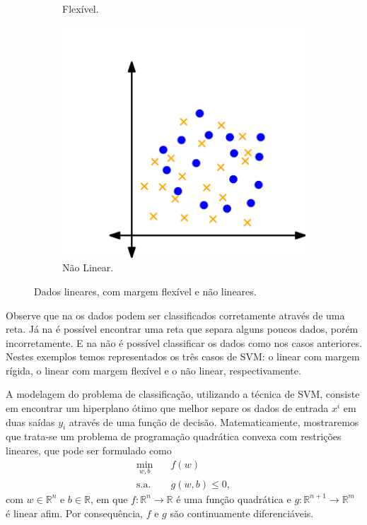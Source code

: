 \documentclass[12pt,a4paper]{scrartcl}
\def\RR{\mathds{R}}
\theoremstyle{definition}%
\begin{document}
\begin{figure}[!ht]
\begin{subfigure}[!ht]{0.3\textwidth}
	\caption{Flexível. \label{fig:classificacao_dados:hiperplano_SVM_flexivel}}
\end{subfigure}
\begin{subfigure}[!ht]{0.3\textwidth}
	\centering
	\includegraphics[width=\textwidth]{hiperplano_SVM_nao_linear}
	\caption{Não Linear. \label{fig:classificacao_dados:hiperplano_SVM_nao_linear}}
\end{subfigure}
\caption{Dados lineares, com margem flexível e não lineares. \label{fig:classificacao_dados}}
\end{figure}

Observe que na  os dados podem ser classificados corretamente através de uma reta. Já na  é possível encontrar uma reta que separa alguns poucos dados, porém incorretamente. E na  não é possível classificar os dados como nos casos anteriores. Nestes exemplos temos representados os três casos de SVM: o linear com margem rígida, o linear com margem flexível e o não linear, respectivamente.

A modelagem do problema de classificação, utilizando a técnica de SVM, consiste em encontrar um hiperplano ótimo que melhor separe os dados de entrada $x^i$ em duas saídas $y_i$ através de uma função de decisão. Matematicamente, mostraremos que trata-se um problema de programação quadrática convexa com restrições lineares, que pode ser formulado como
\[
\begin{aligned}
\min_{w,b} & \quad f(w) \\
\text{s.a.} &  \quad g(w,b) \leq 0, \end{aligned}
\]
com $w\in \RR^n$ e $b\in \RR $, em que $f: \RR^n \rightarrow \RR$ é uma função quadrática e $g: \RR^{n+1} \rightarrow \RR^m$ é linear afim. Por consequência, $f$ e $g$ são continuamente diferenciáveis.
\end{document}
